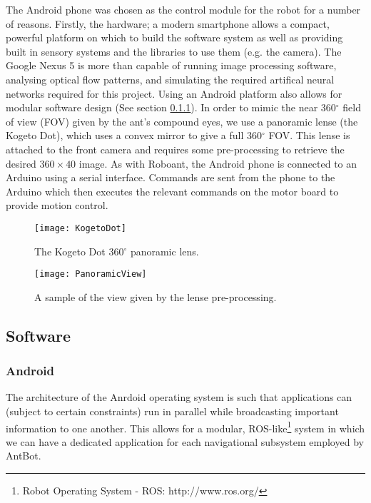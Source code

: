 \documentclass[a4paper,12pt]{article}
\begin{document}
The Android phone was chosen as the control module for the robot for a number of reasons. Firstly,
the hardware; a modern smartphone allows a compact, powerful platform on which to build the
software system as well as providing built in sensory systems and the libraries to use them (e.g. the
camera). The Google Nexus 5 is more than capable of running image processing software, analysing
optical flow patterns, and simulating the required artifical neural networks required for this project.
Using an Android platform also allows for modular software design (See section \ref{subsubsec:droid}).
In order to mimic the near 360$^{\circ}$ field of view (FOV) given by the ant's compound eyes, we use a
panoramic lense (the Kogeto Dot), which uses a convex mirror to give a full 360$^{\circ}$ FOV. This
lense is attached to the front camera and requires some pre-processing to retrieve the desired
$360\times40$ image. As with Roboant, the Android phone is connected to an Arduino using a serial
interface. Commands are sent from the phone to the Arduino which then executes the relevant commands
on the motor board to provide motion control.

\begin{figure}[t!]
  \centering
  \begin{minipage}[t!]{0.45\textwidth}
    \centering
    \texttt{[image: KogetoDot]}
    \caption{The Kogeto Dot 360$^\circ$ panoramic lens.}
  \end{minipage}
  \hfill
  \begin{minipage}[t!]{0.45\textwidth}
    \centering
    \texttt{[image: PanoramicView]}
    \caption{A sample of the view given by the lense pre-processing.}
  \end{minipage}

\end{figure}

\subsection{ Software }
\subsubsection{ Android } \label{subsubsec:droid}
The architecture of the Anrdoid operating system is such that applications can (subject to certain
constraints) run in parallel while broadcasting important information to one another. This allows
for a modular, ROS-like\footnote{Robot Operating System - ROS: http://www.ros.org/}
system in which we can have a dedicated application for each navigational subsystem employed by AntBot.
\newline
\end{document}
